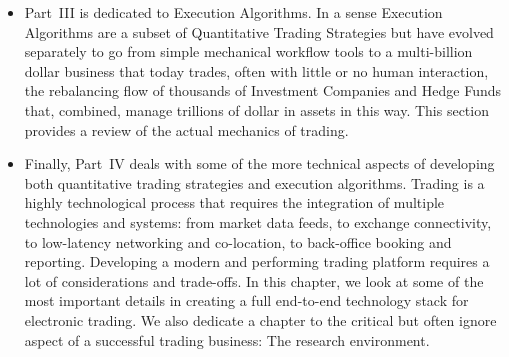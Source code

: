 \begin{itemize}
\item Part~III is dedicated to Execution Algorithms. In a sense Execution Algorithms are a subset of Quantitative Trading Strategies but have evolved separately to go from simple mechanical workflow tools to a multi-billion dollar business that today trades, often with little or no human interaction, the rebalancing flow of thousands of Investment Companies and Hedge Funds that, combined, manage trillions of dollar in assets in this way. This section provides a review of the actual mechanics of trading. 

\item Finally, Part~IV deals with some  of the more technical aspects of developing both quantitative trading strategies and execution algorithms. Trading is a highly technological process that requires the integration of multiple technologies and systems: from market data feeds, to exchange connectivity, to low-latency networking and co-location, to back-office booking and reporting. Developing a modern and performing trading platform requires a lot of considerations and trade-offs. In this chapter, we look at some of the most important details in creating a full end-to-end technology stack for electronic trading. We also dedicate a chapter to the critical but often ignore aspect of a successful trading business: The research environment.
 
\end{itemize} 